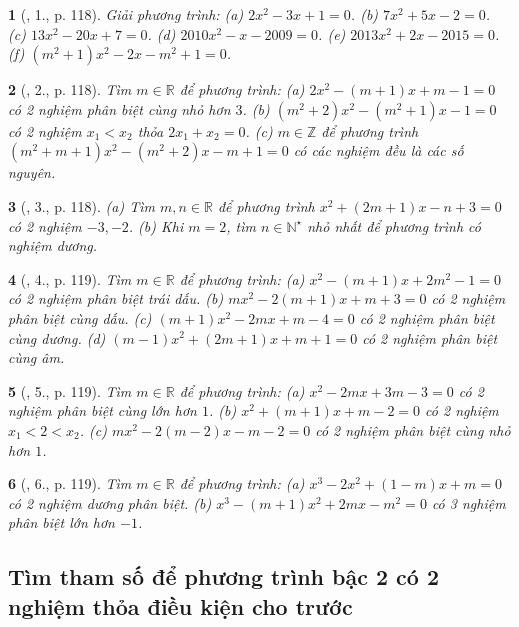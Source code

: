 \documentclass{article}
\newtheorem{baitoan}{}
\begin{document}
\begin{baitoan}[\cite{Thu_Viet_Minh_ptb2}, 1., p. 118]
	Giải phương trình: (a) $2x^2 - 3x + 1 = 0$. (b) $7x^2 + 5x - 2 = 0$. (c) $13x^2 - 20x + 7 = 0$. (d) $2010x^2 - x - 2009 = 0$. (e) $2013x^2 + 2x - 2015 = 0$. (f) $(m^2 + 1)x^2 - 2x - m^2 + 1 = 0$.
\end{baitoan}

\begin{baitoan}[\cite{Thu_Viet_Minh_ptb2}, 2., p. 118]
	Tìm $m\in\mathbb{R}$ để phương trình: (a) $2x^2 - (m + 1)x + m - 1 = 0$ có 2 nghiệm phân biệt cùng nhỏ hơn $3$. (b) $(m^2 + 2)x^2 - (m^2 + 1)x - 1 = 0$ có 2 nghiệm $x_1 < x_2$ thỏa $2x_1 + x_2 = 0$. (c) $m\in\mathbb{Z}$ để phương trình $(m^2 + m + 1)x^2 - (m^2 + 2)x - m + 1 = 0$ có các nghiệm đều là các số nguyên.
\end{baitoan}

\begin{baitoan}[\cite{Thu_Viet_Minh_ptb2}, 3., p. 118]
	(a) Tìm $m,n\in\mathbb{R}$ để phương trình $x^2 + (2m + 1)x - n + 3 = 0$ có 2 nghiệm $-3,-2$. (b) Khi $m = 2$, tìm $n\in\mathbb{N}^\star$ nhỏ nhất để phương trình có nghiệm dương.
\end{baitoan}

\begin{baitoan}[\cite{Thu_Viet_Minh_ptb2}, 4., p. 119]
	Tìm $m\in\mathbb{R}$ để phương trình: (a) $x^2 - (m + 1)x + 2m^2 - 1 = 0$ có 2 nghiệm phân biệt trái dấu. (b) $mx^2 - 2(m + 1)x + m + 3 = 0$ có 2 nghiệm phân biệt cùng dấu. (c) $(m + 1)x^2 - 2mx + m - 4 = 0$ có 2 nghiệm phân biệt cùng dương. (d) $(m - 1)x^2 + (2m + 1)x + m + 1 = 0$ có 2 nghiệm phân biệt cùng âm.
\end{baitoan}

\begin{baitoan}[\cite{Thu_Viet_Minh_ptb2}, 5., p. 119]
	Tìm $m\in\mathbb{R}$ để phương trình: (a) $x^2 - 2mx + 3m - 3 = 0$ có 2 nghiệm phân biệt cùng lớn hơn $1$. (b) $x^2 + (m + 1)x + m - 2 = 0$ có 2 nghiệm $x_1 < 2 < x_2$. (c) $mx^2 - 2(m - 2)x - m - 2 = 0$ có 2 nghiệm phân biệt cùng nhỏ hơn $1$.
\end{baitoan}

\begin{baitoan}[\cite{Thu_Viet_Minh_ptb2}, 6., p. 119]
	Tìm $m\in\mathbb{R}$ để phương trình: (a) $x^3 - 2x^2 + (1 - m)x + m = 0$ có 2 nghiệm dương phân biệt. (b) $x^3 - (m + 1)x^2 + 2mx - m^2 = 0$ có 3 nghiệm phân biệt lớn hơn $-1$.
\end{baitoan}

\subsection{Tìm tham số để phương trình bậc 2 có 2 nghiệm thỏa điều kiện cho trước}
\end{document}
